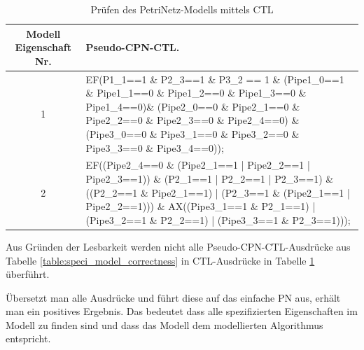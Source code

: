 \begin{table}[H]
	\begin{tabular}{|c|p{10cm}|}
		\hline Modell Eigenschaft Nr. & Pseudo-CPN-CTL.\\ 
		\hline 1 & EF(P1\_1==1 \& P2\_3==1 \& P3\_2 == 1 \& \newline
		(Pipe1\_0==1 \& Pipe1\_1==0 \& Pipe1\_2==0 \& Pipe1\_3==0 \& Pipe1\_4==0)\& \newline
		(Pipe2\_0==0 \& Pipe2\_1==0 \& Pipe2\_2==0 \& Pipe2\_3==0 \& Pipe2\_4==0) \& \newline
		(Pipe3\_0==0 \& Pipe3\_1==0 \& Pipe3\_2==0 \& Pipe3\_3==0 \& Pipe3\_4==0)); \newline \\ 
		\hline 2 & EF((Pipe2\_4==0 \& (Pipe2\_1==1 | Pipe2\_2==1 | Pipe2\_3==1)) \& \newline
		(P2\_1==1 | P2\_2==1 | P2\_3==1) \& \newline
		((P2\_2==1 \& Pipe2\_1==1) | (P2\_3==1 \& (Pipe2\_1==1 | Pipe2\_2==1))) \& \newline
		AX((Pipe3\_1==1 \& P2\_1==1) | (Pipe3\_2==1 \& P2\_2==1) | \newline
		(Pipe3\_3==1 \& P2\_3==1))); \newline \\
		\hline
	\end{tabular}
	\caption{Prüfen des PetriNetz-Modells mittels CTL}
	\label{table:speci_model_correctness_ctl} 
\end{table}

Aus Gründen der Lesbarkeit werden nicht alle Pseudo-CPN-CTL-Ausdrücke aus Tabelle \ref{table:speci_model_correctness} in CTL-Ausdrücke in Tabelle \ref{table:speci_model_correctness_ctl} überführt.

Übersetzt man alle Ausdrücke und führt diese auf das einfache PN aus, erhält man ein positives Ergebnis. Das bedeutet dass alle spezifizierten Eigenschaften im Modell zu finden sind und dass das Modell dem modellierten Algorithmus entspricht.
